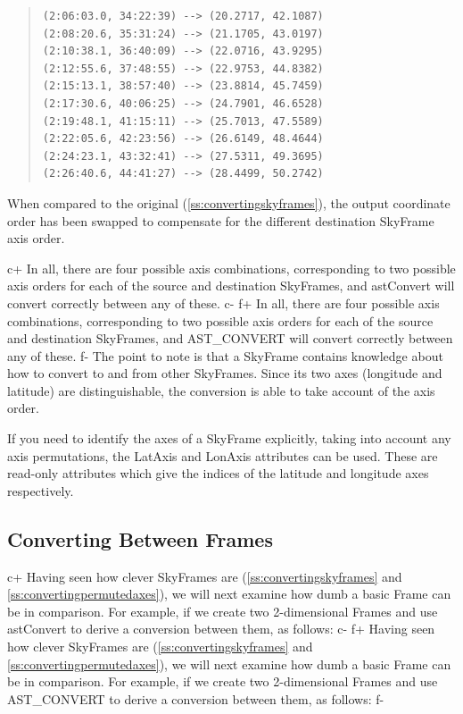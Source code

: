 \documentclass[twoside,11pt]{article}
\newcommand{\secref}[1]{\S\ref{#1}}
\renewcommand{\secref}[1]{\ref{#1}}
\begin{document}
\begin{quote}
\begin{verbatim}
(2:06:03.0, 34:22:39) --> (20.2717, 42.1087)
(2:08:20.6, 35:31:24) --> (21.1705, 43.0197)
(2:10:38.1, 36:40:09) --> (22.0716, 43.9295)
(2:12:55.6, 37:48:55) --> (22.9753, 44.8382)
(2:15:13.1, 38:57:40) --> (23.8814, 45.7459)
(2:17:30.6, 40:06:25) --> (24.7901, 46.6528)
(2:19:48.1, 41:15:11) --> (25.7013, 47.5589)
(2:22:05.6, 42:23:56) --> (26.6149, 48.4644)
(2:24:23.1, 43:32:41) --> (27.5311, 49.3695)
(2:26:40.6, 44:41:27) --> (28.4499, 50.2742)
\end{verbatim}
\end{quote}

When compared to the original (\secref{ss:convertingskyframes}), the
output coordinate order has been swapped to compensate for the
different destination SkyFrame axis order.

c+
In all, there are four possible axis combinations, corresponding to two
possible axis orders for each of the source and destination SkyFrames,
and astConvert will convert correctly between any of these.
c-
f+
In all, there are four possible axis combinations, corresponding to two
possible axis orders for each of the source and destination SkyFrames,
and AST\_CONVERT will convert correctly between any of these.
f-
The point to note is that a SkyFrame contains knowledge about how to
convert to and from other SkyFrames. Since its two axes (longitude and
latitude) are distinguishable, the conversion is able to take account
of the axis order.

If you need to identify the axes of a SkyFrame explicitly, taking into
account any axis permutations, the LatAxis and LonAxis attributes can be
used. These are read-only attributes which give the indices of the
latitude and longitude axes respectively.

\subsection{\label{ss:convertingframes}Converting Between Frames}

c+
Having seen how clever SkyFrames are (\secref{ss:convertingskyframes}
and \secref{ss:convertingpermutedaxes}), we will next examine how dumb
a basic Frame can be in comparison. For example, if we create two
2-dimensional Frames and use astConvert to derive a conversion between
them, as follows:
c-
f+
Having seen how clever SkyFrames are (\secref{ss:convertingskyframes}
and \secref{ss:convertingpermutedaxes}), we will next examine how dumb
a basic Frame can be in comparison. For example, if we create two
2-dimensional Frames and use AST\_CONVERT to derive a conversion
between them, as follows:
f-
\end{document}
